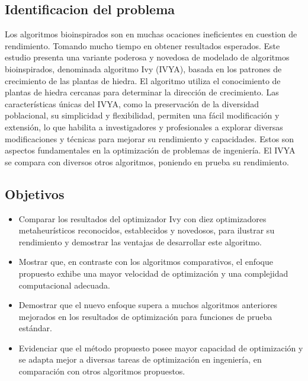 \subsection{Identificacion del problema}
Los algoritmos bioinspirados son en muchas ocaciones ineficientes en cuestion
de rendimiento. Tomando mucho tiempo en obtener resultados esperados. Este
estudio presenta una variante poderosa y novedosa de modelado de algoritmos
bioinspirados, denominada algoritmo Ivy (IVYA), basada en los patrones de
crecimiento de las plantas de hiedra. El algoritmo utiliza el conocimiento de
plantas de hiedra cercanas para determinar la dirección de crecimiento. Las
características únicas del IVYA, como la preservación de la diversidad
poblacional, su simplicidad y flexibilidad, permiten una fácil modificación y
extensión, lo que habilita a investigadores y profesionales a explorar diversas
modificaciones y técnicas para mejorar su rendimiento y capacidades. Estos son
aspectos fundamentales en la optimización de problemas de ingeniería. El IVYA
se compara con diversos otros algoritmos, poniendo en prueba su rendimiento.

\subsection{Objetivos}
\begin{itemize}
    \item Comparar los resultados del optimizador Ivy con diez optimizadores
        metaheurísticos reconocidos, establecidos y novedosos, para ilustrar su
        rendimiento y demostrar las ventajas de desarrollar este algoritmo.\par
    \item Mostrar que, en contraste con los algoritmos comparativos, el enfoque
        propuesto exhibe una mayor velocidad de optimización y una complejidad
        computacional adecuada.\par
    \item Demostrar que el nuevo enfoque supera a muchos algoritmos anteriores
        mejorados en los resultados de optimización para funciones de prueba
        estándar.\par
    \item Evidenciar que el método propuesto posee mayor capacidad de
        optimización y se adapta mejor a diversas tareas de optimización en
        ingeniería, en comparación con otros algoritmos propuestos.\par
\end{itemize}

